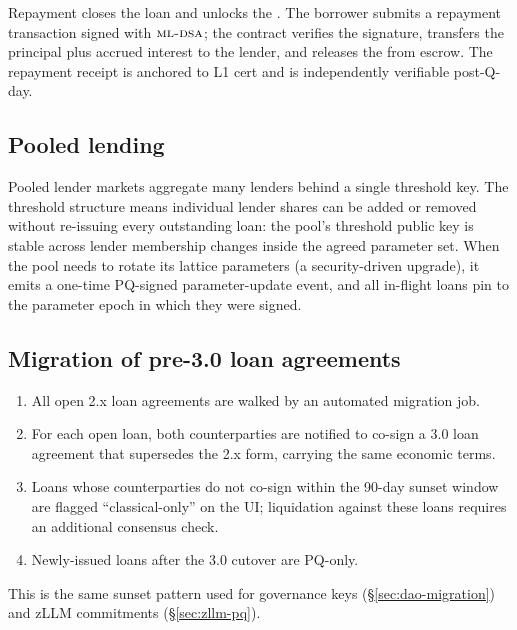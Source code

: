 Repayment closes the loan and unlocks the \NFT{}. The borrower
submits a repayment transaction signed with $\textsc{ml-dsa}{}$; the contract
verifies the signature, transfers the principal plus accrued interest
to the lender, and releases the \NFT{} from escrow. The repayment
receipt is anchored to L1 cert and is independently verifiable
post-Q-day.

\subsection{Pooled lending}

Pooled lender markets aggregate many lenders behind a single
\Ringtail{} threshold key. The threshold structure means individual
lender shares can be added or removed without re-issuing every
outstanding loan: the pool's threshold public key is stable across
lender membership changes inside the agreed parameter set. When
the pool needs to rotate its lattice parameters (a security-driven
upgrade), it emits a one-time PQ-signed parameter-update event, and
all in-flight loans pin to the parameter epoch in which they were
signed.

\subsection{Migration of pre-3.0 loan agreements}

\begin{enumerate}[leftmargin=1.4em]
  \item All open 2.x loan agreements are walked by an automated
        migration job.
  \item For each open loan, both counterparties are notified to
        co-sign a 3.0 loan agreement that supersedes the 2.x form,
        carrying the same economic terms.
  \item Loans whose counterparties do not co-sign within the
        90-day sunset window are flagged ``classical-only'' on the
        UI; liquidation against these loans requires an additional
        consensus check.
  \item Newly-issued loans after the 3.0 cutover are PQ-only.
\end{enumerate}

This is the same sunset pattern used for governance keys
(\S\ref{sec:dao-migration}) and zLLM commitments
(\S\ref{sec:zllm-pq}).
